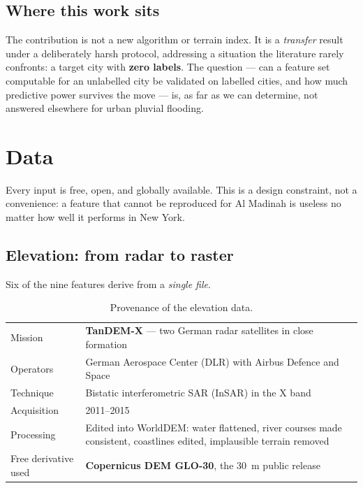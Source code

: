 \documentclass[11pt,a4paper]{article}
\begin{document}
\subsection{Where this work sits}
The contribution is not a new algorithm or terrain index. It is a \emph{transfer} result
under a deliberately harsh protocol, addressing a situation the literature rarely
confronts: a target city with \textbf{zero labels}. The question --- can a feature set
computable for an unlabelled city be validated on labelled cities, and how much
predictive power survives the move --- is, as far as we can determine, not answered
elsewhere for urban pluvial flooding.

\section{Data}\label{sec:data}

Every input is free, open, and globally available. This is a design constraint, not a
convenience: a feature that cannot be reproduced for Al Madinah is useless no matter how
well it performs in New York.

\subsection{Elevation: from radar to raster}\label{sec:dem}
Six of the nine features derive from a \emph{single file}.

\begin{table}[htbp]\centering\small
\caption{Provenance of the elevation data.}\label{tab:dem-prov}
\begin{tabular}{@{}p{3.6cm}p{9.4cm}@{}}
\toprule
Mission & \textbf{TanDEM-X} --- two German radar satellites in close formation
  \citep{krieger2007tandemx}\\
Operators & German Aerospace Center (DLR) with Airbus Defence and Space\\
Technique & Bistatic interferometric SAR (InSAR) in the X band\\
Acquisition & 2011--2015\\
Processing & Edited into WorldDEM: water flattened, river courses made consistent,
  coastlines edited, implausible terrain removed\\
\rowcolor{rowtint}
Free derivative used & \textbf{Copernicus DEM GLO-30}, the \SI{30}{\metre} public
  release \citep{esa2022copdem}\\
\bottomrule
\end{tabular}
\end{table}
\end{document}
